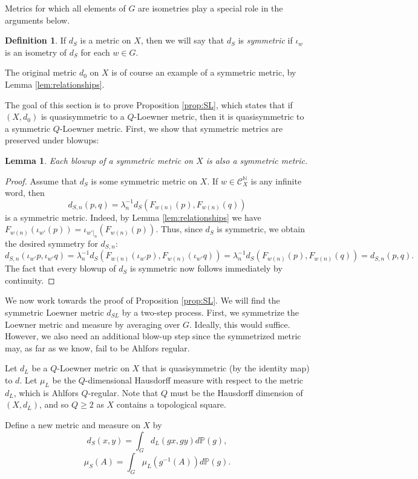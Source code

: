 \documentclass{amsart}
\theoremstyle{plain}
\newtheorem{lemma}[theorem]{Lemma}
\theoremstyle{definition}
\newtheorem{definition}[theorem]{Definition}
\numberwithin{equation}{section}
\numberwithin{theorem}{section}
\newcommand{\N}{\mathbb{N}}
\newcommand{\cC}{\mathcal{C}}
\begin{document}
Metrics for which all elements of $G$ are isometries play a special role in the arguments below.
\begin{definition}
If $d_S$ is a metric on $X$, then we will say that $d_S$ is \textit{symmetric} if $\iota_w$ is an isometry of $d_S$ for each $w\in G$. 
\end{definition}
The original metric $d_0$ on $X$ is of course an example of a symmetric metric, by Lemma \ref{lem:relationships}.

The goal of this section is to prove Proposition \ref{prop:SL}, which states that if $(X,d_0)$ is quasisymmetric to a $Q$-Loewner metric, then it is quasisymmetric to a symmetric $Q$-Loewner metric. First, we show that symmetric metrics are preserved under blowups:

\begin{lemma}\label{lem:symblowup}
Each blowup of a symmetric metric on $X$ is also a symmetric metric.
\end{lemma}
\begin{proof} Assume that $d_S$ is some symmetric metric on $X$. 
If $w\in \cC_X^\N$ is any infinite word, then 
\[
d_{S,n}(p,q)=\lambda_n^{-1}d_S(F_{w(n)}(p),F_{w(n)}(q))
\]
is a symmetric metric. Indeed, by Lemma \ref{lem:relationships} we have $F_{w(n)}(\iota_{w'}(p))=\iota_{w'|_n}(F_{w(n)}(p))$.  Thus, since $d_S$ is symmetric, we obtain the desired symmetry for $d_{S,n}$:
\[
d_{S,n}(\iota_{w'}p,\iota_{w'}q)=\lambda_n^{-1}d_S(F_{w(n)}(\iota_{w'}p),F_{w(n)}(\iota_{w'}q))=\lambda_n^{-1}d_S(F_{w(n)}(p),F_{w(n)}(q))=d_{S,n}(p,q).
\]
The fact that every blowup of $d_S$ is symmetric now follows immediately by continuity.
\end{proof}

We now work towards the proof of Proposition \ref{prop:SL}. We will find the symmetric Loewner metric $d_{SL}$ by a two-step process. First, we symmetrize the Loewner metric and measure by averaging over $G$. Ideally, this would suffice. However, we also need an additional blow-up step since the symmetrized metric may, as far as we know, fail to be Ahlfors regular.

Let $d_L$ be a $Q$-Loewner metric on $X$ that is quasisymmetric (by the identity map) to $d$. Let $\mu_L$ be the $Q$-dimensional Hausdorff measure with respect to the metric $d_L$, which is Ahlfors $Q$-regular. Note that $Q$ must be the Hausdorff dimension of $(X,d_L)$, and so $Q\geq 2$ as $X$ contains a topological square.

Define a new metric and measure on $X$ by
$$ d_{S}(x,y) = \int_G d_L(gx, gy) d\mathbb{P}(g),$$
$$ \mu_{S}(A) = \int_G \mu_L(g^{-1}(A)) d\mathbb{P}(g).$$
\end{document}
